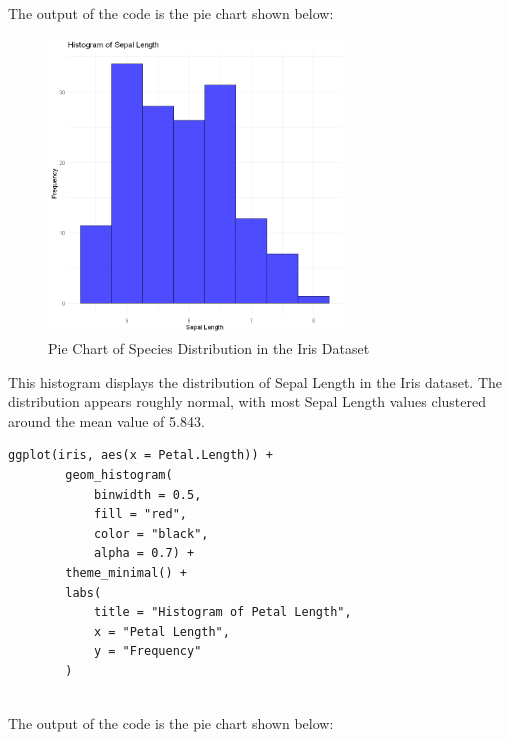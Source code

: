 \documentclass[a4paper,12pt]{article}
\begin{document}
    The output of the code is the pie chart shown below:
    
    \begin{figure}[h]
        \includegraphics[width=0.7\textwidth]{Images/03.png}
        \caption{Pie Chart of Species Distribution in the Iris Dataset}
        \label{fig:pie_chart}
    \end{figure}
    This histogram displays the distribution of Sepal Length in the Iris dataset. The distribution appears roughly normal, with most Sepal Length values clustered around the mean value of 5.843.

    \newpage

    \begin{lstlisting}[style=RStyle]
        ggplot(iris, aes(x = Petal.Length)) +
        geom_histogram(
            binwidth = 0.5,
            fill = "red", 
            color = "black", 
            alpha = 0.7) +
        theme_minimal() +
        labs(
            title = "Histogram of Petal Length",
            x = "Petal Length",
            y = "Frequency"
        )
        
    \end{lstlisting}
        
    The output of the code is the pie chart shown below:
    
\end{document}
